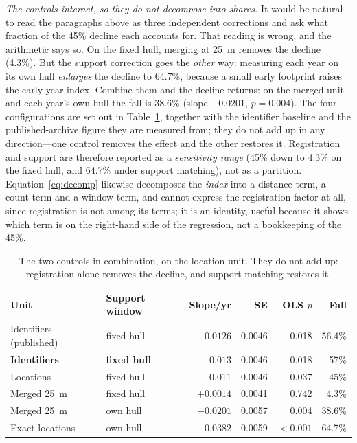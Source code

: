 \documentclass[fleqn,10pt,lineno]{wlpeerj}
\newcommand{\rOwnHull}{64.7}
\newcommand{\hullLocOlsP}{0.037}
\newcommand{\hullIdsOlsP}{0.018}
\newcommand{\locHullDrop}{45}
\newcommand{\rHullDrop}{57}
\newcommand{\rHullSlope}{-0.013}
\newcommand{\rHullLocSlope}{-0.011}
\begin{document}
\noindent\emph{The controls interact, so they do not decompose into shares.} It would be natural
to read the paragraphs above as three independent corrections and ask what fraction of the
\locHullDrop\% decline each accounts for. That reading is wrong, and the arithmetic says so. On
the fixed hull, merging at \SI{25}{\meter} removes the decline (\num{4.3}\%). But the support
correction goes the \emph{other} way: measuring each year on its own hull \emph{enlarges} the
decline to \rOwnHull\%, because a small early footprint raises the early-year index. Combine them
and the decline returns: on the merged unit and each year's own hull the fall is
\num{38.6}\% (slope \num{-0.0201}, $p = 0.004$). The four configurations are set out in
Table~\ref{tab:factorial}, together with the identifier baseline and the published-archive
figure they are measured from; they do not add up in any direction---one control removes the
effect and the other restores it. Registration and support are therefore reported as a
\emph{sensitivity range} (\locHullDrop\% down to \num{4.3}\% on the fixed hull, and
\rOwnHull\% under support matching), not as a partition. Equation~\eqref{eq:decomp} likewise
decomposes the \emph{index} into a distance term, a count term and a window term, and cannot
express the registration factor at all, since registration is not among its terms; it is an
identity, useful because it shows which term is on the right-hand side of the regression, not a
bookkeeping of the \locHullDrop\%.

\begin{table}[htbp]
\centering
\caption{The two controls in combination, on the location unit. They do not add up: registration alone removes the decline, and support matching restores it.}
\label{tab:factorial}
\footnotesize
\setlength{\tabcolsep}{5pt}
\begin{tabular}{llrrrr}
\toprule
Unit & Support window & Slope/yr & SE & OLS $p$ & Fall \\
\midrule
Identifiers (published) & fixed hull & $-0.0126$ & 0.0046 & 0.018 & 56.4\% \\
\textbf{Identifiers} & \textbf{fixed hull} & $\rHullSlope$ & \num{0.0046} & \hullIdsOlsP & \rHullDrop\% \\
Locations & fixed hull & \rHullLocSlope & \num{0.0046} & \hullLocOlsP & \locHullDrop\% \\
Merged \SI{25}{\meter} & fixed hull & $+0.0014$ & 0.0041 & 0.742 & 4.3\% \\
Merged \SI{25}{\meter} & own hull & $-0.0201$ & 0.0057 & 0.004 & 38.6\% \\
Exact locations & own hull & $-0.0382$ & 0.0059 & $<0.001$ & \rOwnHull\% \\
\bottomrule
\end{tabular}
\end{table}
\end{document}
